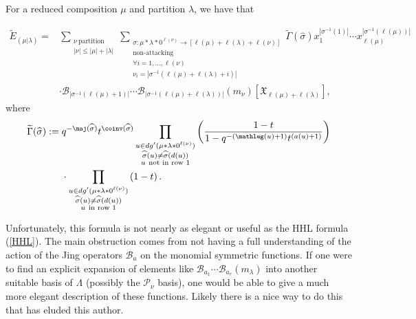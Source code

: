 \begin{coro}\label{formula for stable macdonald}
    For a reduced composition $\mu$ and partition $\lambda$, we have that
    
    \begin{align*}
        \widetilde{E}_{(\mu|\lambda)} = &\sum_{\substack{\nu ~ \text{partition}  \\ |\nu| \leq |\mu|+|\lambda|}} \sum_{\substack{\sigma:\mu*\lambda * 0^{\ell(\nu)} \rightarrow [\ell(\mu)+\ell(\lambda)+\ell(\nu)]\\ \text{non-attacking} \\ \forall i = 1,\ldots,\ell(\nu) \\ \nu_i = |\sigma^{-1}(\ell(\mu)+\ell(\lambda)+i)|}}\widetilde{\Gamma}(\widehat{\sigma}) x_1 ^{|\sigma^{-1}(1)|}\cdots x_{\ell(\mu)} ^{|\sigma^{-1}(\ell(\mu))|} ~ \\
       & \cdot \mathscr{B}_{|\sigma^{-1}(\ell(\mu)+1)|}\cdots \mathscr{B}_{|\sigma^{-1}(\ell(\mu)+\ell(\lambda))|}( m_{\nu})[\mathfrak{X}_{\ell(\mu)+ \ell(\lambda)}],
    \end{align*} 
where 
\begin{align*}
\widetilde{\Gamma}(\widehat{\sigma}) := {} &q^{-\maj(\widehat{\sigma})}t^{\coinv(\widehat{\sigma})} \prod_{\substack{ u \in dg'(\mu*\lambda * 0^{\ell(\nu)}) \\ \widehat{\sigma}(u) \neq \widehat{\sigma}(d(u)) \\ u ~ \text{not in row } 1 }} \left( \frac{1-t}{1-q^{-(\mathleg(u)+1)}t^{(a(u)+1)}} \right) \\
& \cdot \prod_{\substack{ u \in dg'(\mu * \lambda * 0^{\ell(\nu)}) \\ \widehat{\sigma}(u) \neq \widehat{\sigma}(d(u)) \\ u ~ \text{in row } 1 }} \left( 1-t \right) .
\end{align*}
\end{coro}

Unfortunately, this formula is not nearly as elegant or useful as the HHL formula (\ref{HHL}). The main obstruction comes from not having a full understanding of the action of the Jing operators $\mathscr{B}_a$ on the monomial symmetric functions. If one were to find an explicit expansion of elements like $\mathscr{B}_{a_1}\cdots \mathscr{B}_{a_r}(m_{\lambda})$ into another suitable basis of $\Lambda$ (possibly the $\mathcal{P}_{\nu}$ basis), one would be able to give a much more elegant description of these functions. Likely there is a nice way to do this that has eluded this author.


